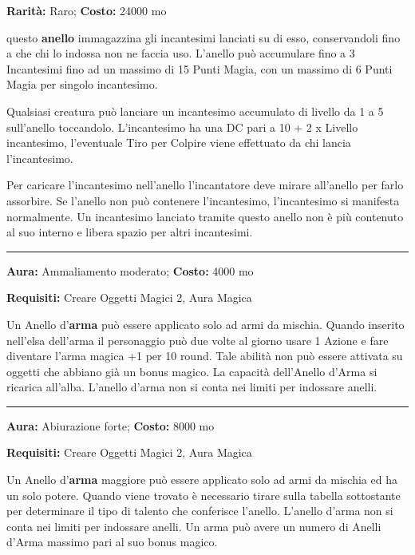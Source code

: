 \begin{multicols}{2}
\textbf{Rarità:} Raro; \textbf{Costo:} 24000 mo

questo \textbf{anello} immagazzina gli incantesimi lanciati su di esso, conservandoli fino a che chi lo indossa non ne faccia uso. L'anello può accumulare fino a 3 Incantesimi fino ad un massimo di 15 Punti Magia, con un massimo di 6 Punti Magia per singolo incantesimo.

Qualsiasi creatura può lanciare un incantesimo accumulato di livello da 1 a 5 sull'anello toccandolo. L'incantesimo ha una DC pari a 10 + 2 x Livello incantesimo, l'eventuale Tiro per Colpire viene effettuato da chi lancia l'incantesimo.

Per caricare l'incantesimo nell'anello l'incantatore deve mirare all'anello per farlo assorbire. Se l'anello non può contenere l'incantesimo, l'incantesimo si manifesta normalmente. Un incantesimo lanciato tramite questo anello non è più contenuto al suo interno e libera spazio per altri incantesimi.

\smallskip\noindent\rule{\linewidth}{2pt}  \hypertarget{Anellod'Arma}{}\medskip{}\noindent\label{Anellod'Arma}

\textbf{Aura:} Ammaliamento moderato; \textbf{Costo:} 4000 mo

\textbf{Requisiti:} Creare Oggetti Magici 2, Aura Magica

Un Anello d'\textbf{arma} può essere applicato solo ad armi da mischia. Quando inserito nell'elsa dell'arma il personaggio può due volte al giorno usare 1 Azione e fare diventare l'arma magica +1 per 10 round. Tale abilità non può essere attivata su oggetti che abbiano già un bonus magico.
La capacità dell'Anello d'Arma si ricarica all'alba. L'anello d'arma non si conta nei limiti per indossare anelli.

\smallskip\noindent\rule{\linewidth}{2pt}  \hypertarget{Anellod'Armamaggiore}{}\medskip{}\noindent\label{Anellod'Armamaggiore}

\textbf{Aura:} Abiurazione forte; \textbf{Costo:} 8000 mo

\textbf{Requisiti:} Creare Oggetti Magici 2, Aura Magica

Un Anello d'\textbf{arma} maggiore può essere applicato solo ad armi da mischia ed ha un solo potere. Quando viene trovato è necessario tirare sulla tabella sottostante per determinare il tipo di talento che conferisce l'anello. L'anello d'arma non si conta nei limiti per indossare anelli. Un arma può avere un numero di Anelli d'Arma massimo pari al suo bonus magico.


\end{multicols}
